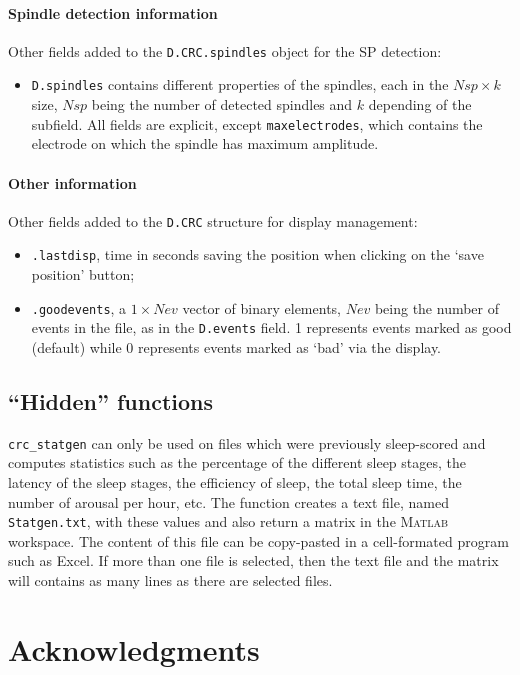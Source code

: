 \documentclass[a4paper,titlepage]{article}
\newcommand{\bi}{\begin{itemize}}
\newcommand{\ei}{\end{itemize}}
\newcommand{\matlab}{\textsc{Matlab }}
\begin{document}
\paragraph{Spindle detection information}
Other fields added to the {\tt D.CRC.spindles} object for the SP detection:
\bi
\item {\tt D.spindles} contains different properties of the spindles, each in the $N\!sp\times k$ size, $N\!sp$ being the number of detected spindles and $k$ depending of the subfield. All fields are explicit, except {\tt maxelectrodes}, which contains the electrode on which the spindle has maximum amplitude.
\ei

\paragraph{Other information}
Other fields added to the {\tt D.CRC} structure for display management:
\bi
\item {\tt .lastdisp}, time in seconds saving the position when clicking on the `save position' button;
\item {\tt .goodevents}, a $1\times N\!ev$ vector of binary elements, $N\!ev$ being the number of events in the file, as in the {\tt D.events} field. 1 represents events marked as good (default) while 0 represents events marked as `bad' via the display.
\ei

\subsection{``Hidden'' functions}
{\tt crc\_statgen} can only be used on files which were previously sleep-scored and computes statistics such as the percentage of the different sleep stages, the latency of the sleep stages, the efficiency of sleep, the total sleep time, the number of arousal per hour, etc. The function creates a text file,  named {\tt Statgen.txt}, with these values and also return a matrix in the \matlab workspace. The content of this file can be copy-pasted in a cell-formated program such as Excel. If more than one file is selected, then the text file and the matrix will contains as many lines as there are selected files.

\section{Acknowledgments}
\label{sec:ackn}
\end{document}

